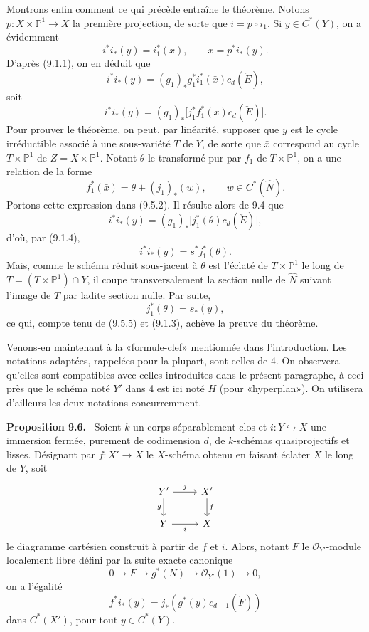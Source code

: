 \documentclass[11pt]{article}
\newenvironment{statement}[1]{\par\medskip\noindent\textbf{#1.}\ }{\par\medskip}
\begin{document}
Montrons enfin comment ce qui précède entraîne le théorème. Notons $p:X\times\mathbb P^1\to X$ la première projection, de sorte que $i=p\circ i_1$. Si $y\in C^*(Y)$, on a évidemment
\[
i^*i_*(y)=i_1^*(\bar x),\qquad \bar x=p^*i_*(y).
\tag{9.5.1}
\]
D'après (9.1.1), on en déduit que
\[
i^*i_*(y)=(g_1)_*g_1^*i_1^*(\bar x)c_d(\check E),
\]
soit
\[
i^*i_*(y)=(g_1)_*\bigl[j_1^*f_1^*(\bar x)c_d(\check E)\bigr].
\tag{9.5.2}
\]
Pour prouver le théorème, on peut, par linéarité, supposer que $y$ est le cycle irréductible associé à une sous-variété $T$ de $Y$, de sorte que $\bar x$ correspond au cycle $T\times\mathbb P^1$ de $Z=X\times\mathbb P^1$. Notant $\theta$ le transformé pur par $f_1$ de $T\times\mathbb P^1$, on a une relation de la forme
\[
f_1^*(\bar x)=\theta+(j_1)_*(w),\qquad w\in C^*(\widehat N).
\tag{9.5.3}
\]
Portons cette expression dans (9.5.2). Il résulte alors de 9.4 que
\[
i^*i_*(y)=(g_1)_*\bigl[j_1^*(\theta)c_d(\check E)\bigr],
\tag{9.5.4}
\]
d'où, par (9.1.4),
\[
i^*i_*(y)=s^*j_1^*(\theta).
\tag{9.5.5}
\]
Mais, comme le schéma réduit sous-jacent à $\theta$ est l'éclaté de $T\times\mathbb P^1$ le long de $T=(T\times\mathbb P^1)\cap Y$, il coupe transversalement la section nulle de $\widehat N$ suivant l'image de $T$ par ladite section nulle. Par suite,
\[
j_1^*(\theta)=s_*(y),
\]
ce qui, compte tenu de (9.5.5) et (9.1.3), achève la preuve du théorème.

Venons-en maintenant à la «formule-clef» mentionnée dans l'introduction. Les notations adaptées, rappelées pour la plupart, sont celles de 4. On observera qu'elles sont compatibles avec celles introduites dans le présent paragraphe, à ceci près que le schéma noté $Y'$ dans 4 est ici noté $H$ (pour «hyperplan»). On utilisera d'ailleurs les deux notations concurremment.

\begin{statement}{Proposition 9.6}
Soient $k$ un corps séparablement clos et $i:Y\hookrightarrow X$ une immersion fermée, purement de codimension $d$, de $k$-schémas quasiprojectifs et lisses. Désignant par $f:X'\to X$ le $X$-schéma obtenu en faisant éclater $X$ le long de $Y$, soit
\[
\begin{tikzcd}
Y'\arrow[r,"j"]\arrow[d,"g"']&X'\arrow[d,"f"]\\
Y\arrow[r,"i"']&X
\end{tikzcd}
\]
le diagramme cartésien construit à partir de $f$ et $i$. Alors, notant $F$ le $\mathcal O_{Y'}$-module localement libre défini par la suite exacte canonique
\[
0\to F\to g^*(N)\to\mathcal O_{Y'}(1)\to0,
\tag{9.6.1}
\]
on a l'égalité
\[
f^*i_*(y)=j_*(g^*(y)c_{d-1}(\check F))
\tag{9.6.2}
\]
dans $C^*(X')$, pour tout $y\in C^*(Y)$.
\end{statement}
\end{document}
